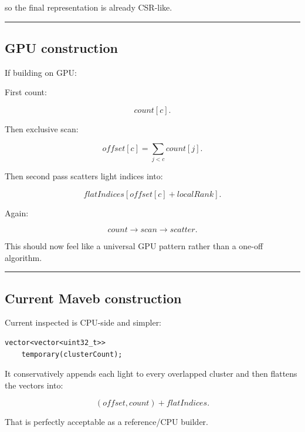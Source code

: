 so the final representation is already CSR-like.

\begin{center}\rule{0.5\linewidth}{0.5pt}\end{center}

\subsection{GPU construction}\label{04-visual-computing-ii-ch040-gpu-construction}

\hypertarget{04-visual-computing-ii-ch040-gpu-construction}{}

If building on GPU:

First count:

\[
count[c].
\]

Then exclusive scan:

\[
offset[c]
=
\sum_{j<c}count[j].
\]

Then second pass scatters light indices into:

\[
flatIndices[
offset[c]+localRank
].
\]

Again:

\[
\boxed{
count
\rightarrow
scan
\rightarrow
scatter.
}
\]

This should now feel like a universal GPU pattern rather than a one-off algorithm.

\begin{center}\rule{0.5\linewidth}{0.5pt}\end{center}

\subsection{Current Maveb construction}\label{04-visual-computing-ii-ch040-current-maveb-construction}

\hypertarget{04-visual-computing-ii-ch040-current-maveb-construction}{}

Current inspected  is CPU-side and simpler:

\begin{verbatim}
vector<vector<uint32_t>>
    temporary(clusterCount);
\end{verbatim}

It conservatively appends each light to every overlapped cluster and then flattens the vectors into:

\[
(offset,count)
+
flatIndices.
\]

That is perfectly acceptable as a reference/CPU builder.

